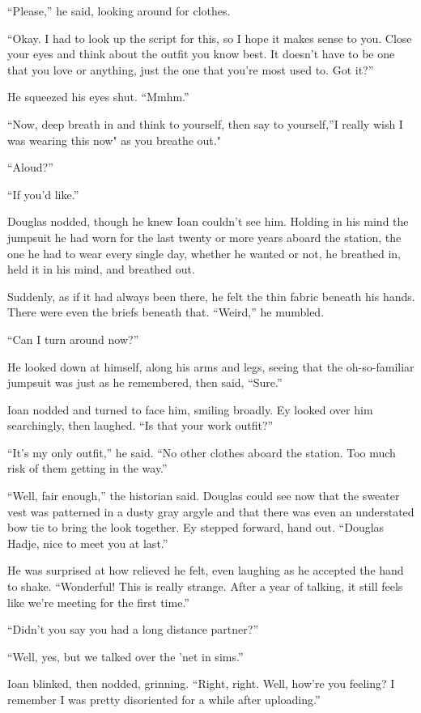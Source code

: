 ``Please,'' he said, looking around for clothes.

``Okay. I had to look up the script for this, so I hope it makes sense to you. Close your eyes and think about the outfit you know best. It doesn't have to be one that you love or anything, just the one that you're most used to. Got it?''

He squeezed his eyes shut. ``Mmhm.''

``Now, deep breath in and think to yourself, then say to yourself,''I really wish I was wearing this now" as you breathe out."

``Aloud?''

``If you'd like.''

Douglas nodded, though he knew Ioan couldn't see him. Holding in his mind the jumpsuit he had worn for the last twenty or more years aboard the station, the one he had to wear every single day, whether he wanted or not, he breathed in, held it in his mind, and breathed out.

Suddenly, as if it had always been there, he felt the thin fabric beneath his hands. There were even the briefs beneath that. ``Weird,'' he mumbled.

``Can I turn around now?''

He looked down at himself, along his arms and legs, seeing that the oh-so-familiar jumpsuit was just as he remembered, then said, ``Sure.''

Ioan nodded and turned to face him, smiling broadly. Ey looked over him searchingly, then laughed. ``Is that your work outfit?''

``It's my only outfit,'' he said. ``No other clothes aboard the station. Too much risk of them getting in the way.''

``Well, fair enough,'' the historian said. Douglas could see now that the sweater vest was patterned in a dusty gray argyle and that there was even an understated bow tie to bring the look together. Ey stepped forward, hand out. ``Douglas Hadje, nice to meet you at last.''

He was surprised at how relieved he felt, even laughing as he accepted the hand to shake. ``Wonderful! This is really strange. After a year of talking, it still feels like we're meeting for the first time.''

``Didn't you say you had a long distance partner?''

``Well, yes, but we talked over the 'net in sims.''

Ioan blinked, then nodded, grinning. ``Right, right. Well, how're you feeling? I remember I was pretty disoriented for a while after uploading.''

